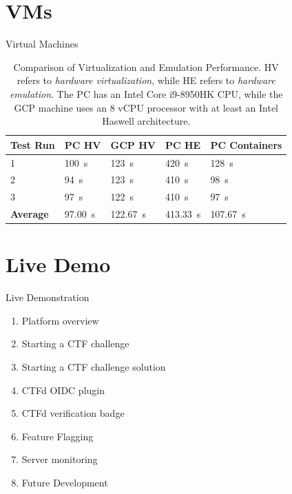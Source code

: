 \documentclass{beamer}
\begin{document}
\section{VMs}
\begin{frame}{Virtual Machines}
\begin{table}[h]
\centering
\begin{tabular}{|l|l|l|l|l|}
\hline
\textbf{Test Run} & \textbf{PC HV} & \textbf{GCP HV} & \textbf{PC HE} & \textbf{PC Containers} \\ \hline
1 & \SI{100}{\second} & \SI{123}{\second} & \SI{420}{\second} & \SI{128}{\second} \\ \hline
2 & \SI{94}{\second}  & \SI{123}{\second} & \SI{410}{\second} & \SI{98}{\second}  \\ \hline
3 & \SI{97}{\second}  & \SI{122}{\second} & \SI{410}{\second} & \SI{97}{\second}  \\ \hline \hline
\textbf{Average} & \SI{97.00}{\second} & \SI{122.67}{\second} & \SI{413.33}{\second} & \SI{107.67}{\second} \\ \hline
\end{tabular}
\caption{Comparison of Virtualization and Emulation Performance. HV refers to \textit{hardware virtualization}, while HE refers to \textit{hardware emulation}. The PC has an Intel Core i9-8950HK CPU, while the GCP machine uses an 8 vCPU processor with at least an Intel Haswell architecture.}
\label{table:performance}
\end{table}
\end{frame}

\section{Live Demo}
\begin{frame}{Live Demonstration}
    \begin{enumerate}
        \item Platform overview
        \item Starting a CTF challenge
        \item Starting a CTF challenge solution
        \item CTFd OIDC plugin
        \item CTFd verification badge
        \item Feature Flagging
        \item Server monitoring
        \item Future Development
    \end{enumerate}
\end{frame}
\end{document}
